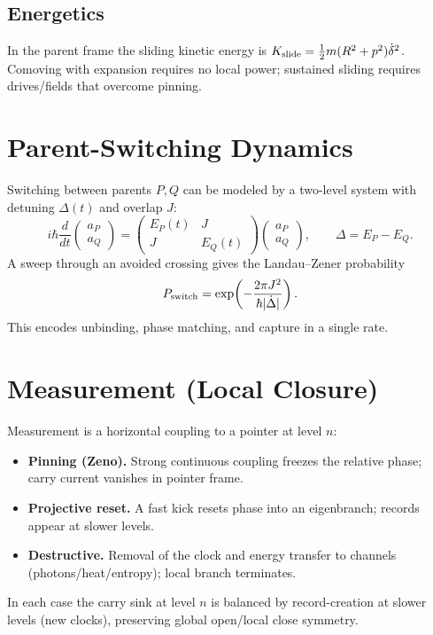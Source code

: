 \documentclass[11pt]{article}
\begin{document}
\subsection{Energetics}
In the parent frame the sliding kinetic energy is $K_{\rm slide}=\tfrac12 m(R^2+p^2)\dot\delta^2$.
Comoving with expansion requires no local power; sustained sliding requires drives/fields that overcome pinning.

\section{Parent-Switching Dynamics}
Switching between parents $P,Q$ can be modeled by a two-level system with detuning $\Delta(t)$ and overlap $J$:
\begin{equation}
i\hbar\frac{d}{dt}\!\begin{pmatrix}a_P\\ a_Q\end{pmatrix}=\begin{pmatrix}E_P(t)&J\\J&E_Q(t)\end{pmatrix}\!\begin{pmatrix}a_P\\ a_Q\end{pmatrix},\qquad \Delta=E_P-E_Q.
\end{equation}
A sweep through an avoided crossing gives the Landau--Zener probability
\begin{equation}
P_{\rm switch}=\exp\!\left(-\frac{2\pi J^2}{\hbar|\dot\Delta|}\right).
\end{equation}
This encodes unbinding, phase matching, and capture in a single rate.

\section{Measurement (Local Closure)}
Measurement is a horizontal coupling to a pointer at level $n$:
\begin{itemize}
\item \textbf{Pinning (Zeno).} Strong continuous coupling freezes the relative phase; carry current vanishes in pointer frame.
\item \textbf{Projective reset.} A fast kick resets phase into an eigenbranch; records appear at slower levels.
\item \textbf{Destructive.} Removal of the clock and energy transfer to channels (photons/heat/entropy); local branch terminates.
\end{itemize}
In each case the carry sink at level $n$ is balanced by record-creation at slower levels (new clocks), preserving global open/local close symmetry.
\end{document}
